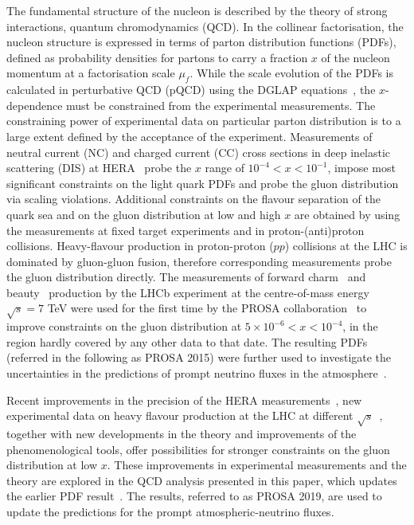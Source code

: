 \documentclass[12pt]{article}
\begin{document}
The fundamental structure of the nucleon is described by the theory of strong interactions, quantum chromodynamics (QCD).
In the collinear factorisation, the nucleon structure is expressed in terms of parton distribution functions (PDFs), defined 
as probability densities for partons to carry a fraction $x$ of the nucleon momentum at a factorisation scale $\mu_f$. While the 
scale evolution of the PDFs is calculated in perturbative QCD (pQCD) using the DGLAP equations~\cite{Dokshitzer:1977sg,Gribov:1972ri,Altarelli:1977zs,Curci:1980uw,Furmanski:1980cm,Moch:2004pa,Vogt:2004mw}, the 
$x$-dependence must be constrained from the experimental measurements. The constraining power of experimental data 
on particular parton distribution is to a large extent defined by the acceptance of the experiment. Measurements of 
neutral current (NC) and charged current (CC) cross sections in deep inelastic scattering (DIS) at HERA~\cite{Abramowicz:2015mha} probe the $x$ range of $10^{-4}<x<10^{-1}$, impose most significant constraints on the light quark PDFs and probe the gluon distribution via scaling violations. Additional constraints on the flavour separation of the quark sea and on the gluon distribution at low and high $x$ are obtained by using the measurements at fixed target experiments and in proton-(anti)proton collisions. Heavy-flavour production in proton-proton ($pp$) collisions at the LHC is dominated by gluon-gluon fusion, therefore corresponding measurements probe the gluon distribution directly. The measurements of forward charm~\cite{Aaij:2013mga} and beauty~\cite{Aaij:2013noa} production by the LHCb experiment at the centre-of-mass energy $\sqrt{s}=7$ TeV were used for the first time by the PROSA collaboration~\cite{Zenaiev:2015rfa} to improve constraints on the gluon distribution at $5 \times 10^{-6}< x < 10^{-4}$, in the region hardly covered by any other data to that date. The resulting PDFs (referred in the following as PROSA 2015) were further used to investigate the uncertainties in the predictions of prompt neutrino fluxes in the atmosphere~\cite{Garzelli:2016xmx}.       

Recent improvements in the precision of the HERA measurements~\cite{Abramowicz:2015mha,H1:2018flt}, new experimental data on heavy flavour production at the LHC at 
different $\sqrt{s}$~\cite{Aaij:2015bpa,Aaij:2016jht,Acharya:2017jgo,Acharya:2019mgn}, together with new developments in the theory and improvements of the phenomenological tools, offer 
possibilities for stronger constraints on the gluon distribution at low $x$. These improvements in experimental measurements 
and the theory are explored in the QCD analysis presented in this paper, which updates the earlier PDF result~\cite{Zenaiev:2015rfa}. The results, referred to as PROSA 2019, are used to update the predictions for the prompt atmospheric-neutrino fluxes. 
\end{document}
